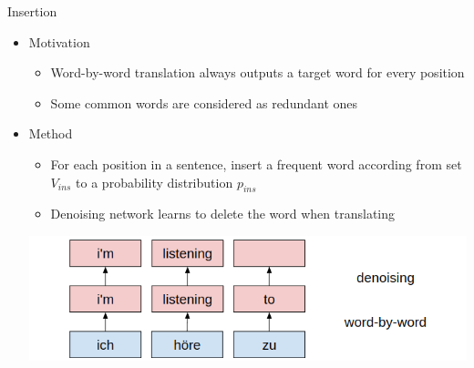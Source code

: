\documentclass[11pt, a4paper, landscape]{article}
\begin{document}
\NewPage
{}	
\vfill	
Insertion
\begin{itemize}
	\item Motivation
	\begin{itemize}
		\item Word-by-word translation always outputs a target word for every position
		\item Some common words are considered as redundant ones
	\end{itemize}
	\item Method
	\begin{itemize}
		\item For each position in a sentence, insert a frequent word according from set ${V_{ins}}$ to a probability distribution ${p_{ins}}$
		\item Denoising network learns to delete the word when translating
	\end{itemize}
	\begin{center}
		\vspace{0.5em}
		\hspace{-1cm}\includegraphics[width=0.8\linewidth]{insertion}
	\end{center}\vspace{0.5em}	
\end{itemize}

\vfill
\end{document}
